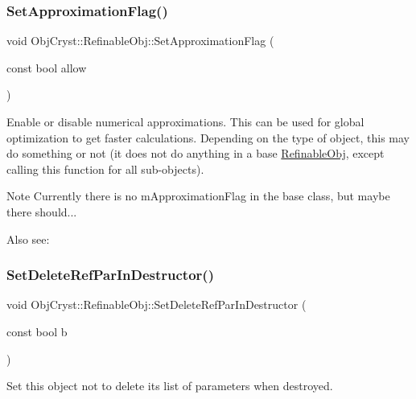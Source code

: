 \subsubsection{\texorpdfstring{SetApproximationFlag()}{SetApproximationFlag()}}
{\footnotesize\ttfamily void Obj\+Cryst\+::\+Refinable\+Obj\+::\+Set\+Approximation\+Flag (\begin{DoxyParamCaption}\item[{const bool}]{allow }\end{DoxyParamCaption})\hspace{0.3cm}{\ttfamily [virtual]}}

Enable or disable numerical approximations. This can be used for global optimization to get faster calculations. Depending on the type of object, this may do something or not (it does not do anything in a base \mbox{\hyperlink{class_obj_cryst_1_1_refinable_obj}{Refinable\+Obj}}, except calling this function for all sub-\/objects).

\begin{DoxyNote}{Note}
Currently there is no m\+Approximation\+Flag in the base class, but maybe there should...
\end{DoxyNote}
Also see\+: \mbox{\label{class_obj_cryst_1_1_refinable_obj_a33f94e9c9c0717ea77c8b9427e9e137e}} 
\subsubsection{\texorpdfstring{SetDeleteRefParInDestructor()}{SetDeleteRefParInDestructor()}}
{\footnotesize\ttfamily void Obj\+Cryst\+::\+Refinable\+Obj\+::\+Set\+Delete\+Ref\+Par\+In\+Destructor (\begin{DoxyParamCaption}\item[{const bool}]{b }\end{DoxyParamCaption})}

Set this object not to delete its list of parameters when destroyed.

